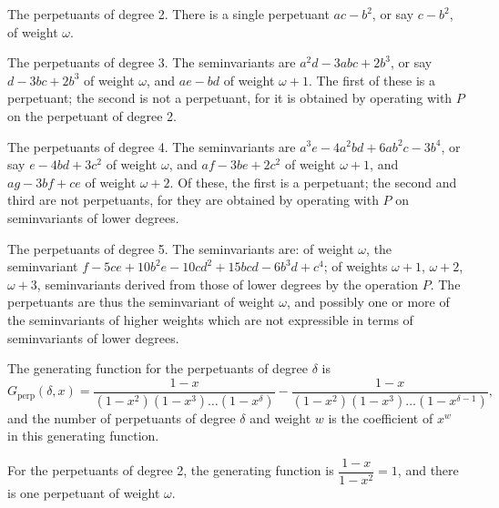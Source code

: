 \documentclass[11pt,a4paper]{book}
\begin{document}
{{{\setcounter{art}{53}
\begin{art}
The perpetuants of degree 2. There is a single perpetuant $ac - b^{2}$, or say $c - b^{2}$, of weight $\omega$.
\end{art}

\setcounter{art}{54}
\begin{art}
The perpetuants of degree 3. The seminvariants are $a^{2}d - 3abc + 2b^{3}$, or say $d - 3bc + 2b^{3}$ of weight $\omega$, and $ae - bd$ of weight $\omega + 1$. The first of these is a perpetuant; the second is not a perpetuant, for it is obtained by operating with $P$ on the perpetuant of degree 2.
\end{art}

\setcounter{art}{55}
\begin{art}
The perpetuants of degree 4. The seminvariants are $a^{3}e - 4a^{2}bd + 6ab^{2}c - 3b^{4}$, or say $e - 4bd + 3c^{2}$ of weight $\omega$, and $af - 3be + 2c^{2}$ of weight $\omega + 1$, and $ag - 3bf + ce$ of weight $\omega + 2$. Of these, the first is a perpetuant; the second and third are not perpetuants, for they are obtained by operating with $P$ on seminvariants of lower degrees.
\end{art}

\setcounter{art}{56}
\begin{art}
The perpetuants of degree 5. The seminvariants are: of weight $\omega$, the seminvariant $f - 5ce + 10b^{2}e - 10cd^{2} + 15bcd - 6b^{3}d + c^{4}$; of weights $\omega + 1$, $\omega + 2$, $\omega + 3$, seminvariants derived from those of lower degrees by the operation $P$. The perpetuants are thus the seminvariant of weight $\omega$, and possibly one or more of the seminvariants of higher weights which are not expressible in terms of seminvariants of lower degrees.
\end{art}

\setcounter{art}{57}
\begin{art}
The generating function for the perpetuants of degree $\delta$ is
\[
G_{\text{perp}}(\delta, x) = \frac{1 - x}{(1 - x^{2})(1 - x^{3})\ldots(1 - x^{\delta})} - \frac{1 - x}{(1 - x^{2})(1 - x^{3})\ldots(1 - x^{\delta - 1})},
\]
and the number of perpetuants of degree $\delta$ and weight $w$ is the coefficient of $x^{w}$ in this generating function.
\end{art}

\setcounter{art}{58}
\begin{art}
For the perpetuants of degree 2, the generating function is $\dfrac{1 - x}{1 - x^{2}} = 1$, and there is one perpetuant of weight $\omega$.


\end{art}}}}
\end{document}
